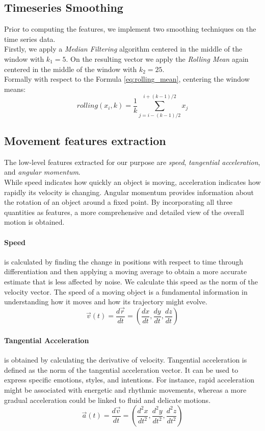 \subsection{Timeseries Smoothing}
Prior to computing the features, we implement two smoothing techniques on the time series data. \\
Firstly, we apply a \textit{Median Filtering} algorithm centered in the middle of the window with $k_1 = 5$. 
On the resulting vector we apply the \textit{Rolling Mean} again centered in the middle of the window with $k_2 = 25 $. \\
Formally with respect to the Formula \ref{eq:rolling_mean}, centering the window means:
\begin{equation}
  rolling(x_i,k) = \frac{1}{k} \sum_{j=i-(k-1)/2}^{i+(k-1)/2} x_j
\end{equation}

\subsection{Movement features extraction}
\label{subsec:alg_features}
The low-level features extracted for our purpose are \textit{speed}, \textit{tangential acceleration}, and \textit{angular momentum}. \\
While speed indicates how quickly an object is moving, acceleration indicates how rapidly its velocity is changing.
Angular momentum provides information about the rotation of an object around a fixed point.
By incorporating all three quantities as features, a more comprehensive and detailed view of the overall motion is obtained.

\paragraph{Speed} is calculated by finding the change in positions with respect to time through differentiation and then applying a moving average to obtain a more accurate estimate that is less affected by noise.
We calculate this speed as the norm of the velocity vector.
The speed of a moving object is a fundamental information in understanding how it moves and how its trajectory might evolve.
\begin{equation}
  \vec{v}(t) = \frac{d\vec{r}}{dt} = \left(\frac{dx}{dt}, \frac{dy}{dt}, \frac{dz}{dt}\right)
\end{equation}


\paragraph{Tangential Acceleration} is obtained by calculating the derivative of velocity.
Tangential acceleration is defined as the norm of the tangential acceleration vector.
It can be used to express specific emotions, styles, and intentions.
For instance, rapid acceleration might be associated with energetic and rhythmic movements, whereas a more gradual acceleration could be linked to fluid and delicate motions.
\begin{equation}
  \vec{a}(t) = \frac{d\vec{v}}{dt} = \left(\frac{d^2x}{dt^2}, \frac{d^2y}{dt^2}, \frac{d^2z}{dt^2}\right)
\end{equation}


